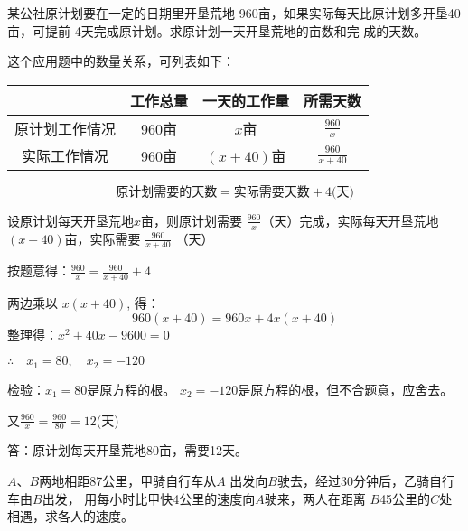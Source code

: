 \begin{example}
    某公社原计划要在一定的日期里开垦荒地
960亩，如果实际每天比原计划多开垦40亩，可提前
4天完成原计划。求原计划一天开垦荒地的亩数和完
成的天数。
\end{example}

\begin{analyze}
    这个应用题中的数量关系，可列表如下：
\begin{center}
    \begin{tabular}{cccc}
        \hline
    &    工作总量&一天的工作量&所需天数\\
    \hline
原计划工作情况&960亩& $x$亩  & $\tfrac{960}{x}$\\
实际工作情况&960亩&$(x+40)$亩 & $\tfrac{960}{x+40}$\\
\hline
    \end{tabular}
\end{center}
\[\text{原计划需要的天数}=\text{实际需要天数}+4\text{(天)}\]
\end{analyze}


\begin{solution}
    设原计划每天开垦荒地$x$亩，则原计划需要
    $\frac{960}{x}$（天）完成，实际每天开垦荒地$(x+40)$亩，实际需要
   $\frac{960}{x+40}$
    （天）
    
    按题意得：$\frac{960}{x}=\frac{960}{x+40}+4$
    
    两边乘以
    $x(x+40)$, 得：
    \[960(x+40)=960x+4x(x+40)\]
    整理得：$x^2+40x-9600=0$

    $\therefore\quad x_1=80,\quad x_2=-120$
    
    检验：$x_1=80$是原方程的根。    $x_2=-120$是原方程的根，但不合题意，应舍去。

    又$\frac{960}{x}=\frac{960}{80}=12$(天)

    答：原计划每天开垦荒地80亩，需要12天。
\end{solution}


\begin{example}
    $A$、$B$两地相距87公里，甲骑自行车从$A$
出发向$B$驶去，经过30分钟后，乙骑自行车由$B$出发，
用每小时比甲快4公里的速度向$A$驶来，两人在距离
$B$45公里的$C$处相遇，求各人的速度。
\end{example}


